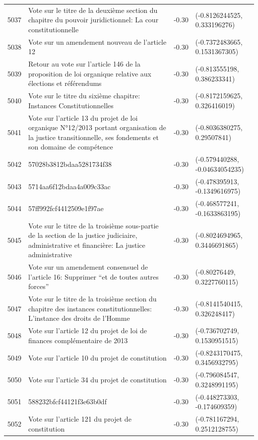 \begin{table}[ht]
\begin{tabular}{rlrl}
  5037 & Vote sur le titre de la deuxième section du chapitre du pouvoir juridictionnel: La cour constitutionnelle & -0.30 & (-0.8126244525, 0.333196276) \\ 
  5038 & Vote sur un amendement nouveau de l'article 12 & -0.30 & (-0.7372483665, 0.1531367305) \\ 
  5039 & Retour au vote sur l'article 146 de la proposition de loi organique relative aux élections et référendums & -0.30 & (-0.813555198, 0.386233341) \\ 
  5040 & Vote sur le titre du sixième chapitre: Instances Constitutionnelles & -0.30 & (-0.8172159625, 0.326416019) \\ 
  5041 & Vote sur l'article 13 du projet de loi organique N°12/2013 portant organisation de la justice transitionnelle, ses fondements et son domaine de compétence & -0.30 & (-0.8036380275, 0.29507841) \\ 
  5042 & 57028b3812bdaa5281734f38 & -0.30 & (-0.579440288, -0.04634054235) \\ 
  5043 & 5714aa6f12bdaa4a009c33ac & -0.30 & (-0.478395913, -0.1349616975) \\ 
  5044 & 57ff992fcf4412509e1f97ae & -0.30 & (-0.468577241, -0.1633863195) \\ 
  5045 & Vote sur le titre de la troisième sous-partie de la section de la justice judiciaire, administrative et financière: La justice administrative & -0.30 & (-0.8024694965, 0.3446691865) \\ 
  5046 & Vote sur un amendement consensuel de l'article 16: Supprimer “et de toutes autres forces” & -0.30 & (-0.80276449, 0.3227760115) \\ 
  5047 & Vote sur le titre de la troisième section du chapitre des instances constitutionnelles: L'instance des droits de l'Homme & -0.30 & (-0.8141540415, 0.326248417) \\ 
  5048 & Vote sur l'article 12 du projet de loi de finances complémentaire de 2013 & -0.30 & (-0.736702749, 0.1530951515) \\ 
  5049 & Vote sur l'article 10 du projet de constitution & -0.30 & (-0.8243170475, 0.3456932795) \\ 
  5050 & Vote sur l'article 34 du projet de constitution & -0.30 & (-0.796084547, 0.3248991195) \\ 
  5051 & 588232bfcf44121f3e63b0df & -0.30 & (-0.448273303, -0.174609359) \\ 
  5052 & Vote sur l'article 121 du projet de constitution & -0.30 & (-0.781167294, 0.2512128755) \\ 

\end{tabular}
\end{table}

